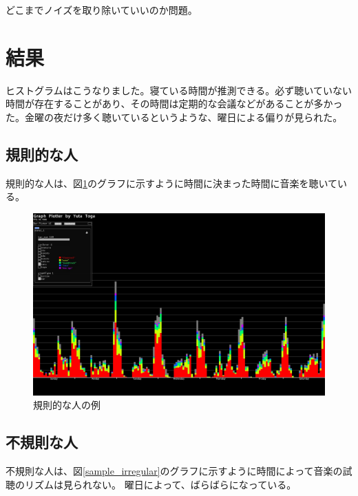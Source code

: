 \documentclass{jsarticle}
\begin{document}
	
どこまでノイズを取り除いていいのか問題。



\section{結果}


ヒストグラムはこうなりました。寝ている時間が推測できる。必ず聴いていない時間が存在することがあり、その時間は定期的な会議などがあることが多かった。金曜の夜だけ多く聴いているというような、曜日による偏りが見られた。
\subsection{規則的な人}
規則的な人は、図\ref{sample_regular}のグラフに示すように時間に決まった時間に音楽を聴いている。
\begin{figure}[h]
\begin{center}
\includegraphics[width=14cm]{sample_regular.jpg}
\caption{規則的な人の例}
\label{sample_regular}
\end{center}
\end{figure}


\subsection{不規則な人}
不規則な人は、図\ref{sample_irregular}のグラフに示すように時間によって音楽の試聴のリズムは見られない。
曜日によって、ばらばらになっている。
\end{document}
